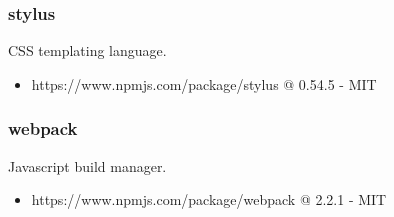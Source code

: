   \subsubsection{stylus}
  CSS templating language.
  \begin{itemize}
    \item https://www.npmjs.com/package/stylus @ 0.54.5 - MIT
  \end{itemize}

  \subsubsection{webpack}
  Javascript build manager.
  \begin{itemize}
    \item https://www.npmjs.com/package/webpack @ 2.2.1 - MIT
  \end{itemize}






